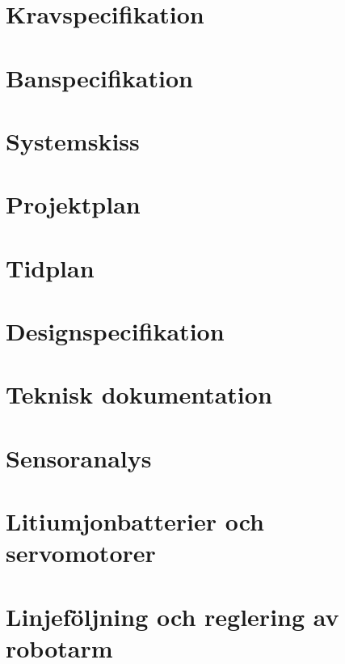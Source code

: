 

\section{Kravspecifikation}
\label{sec:kravspec}

\section{Banspecifikation}
\label{sec:banspec}

\section{Systemskiss}
\label{sec:systemskiss}

\section{Projektplan}
\label{sec:projektplan}

\section{Tidplan}
\label{sec:tidplan}

\section{Designspecifikation}
\label{sec:designspec}

\section{Teknisk dokumentation}
\label{sec:tekdok}

\section{Sensoranalys}
\label{sec:sensoruppgift}

\section{Litiumjonbatterier och servomotorer}
\label{sec:batteriservouppgift}

\section{Linjeföljning och reglering av robotarm}
\label{sec:regleruppgift}


